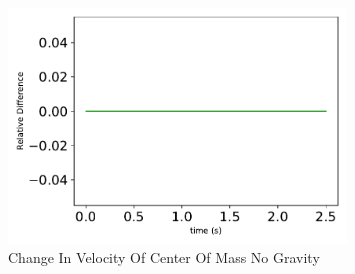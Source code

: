 \begin{figure}[htbp]\centerline{\includegraphics[width=0.8\textwidth]{AutoTeX/ChangeInVelocityOfCenterOfMassNoGravity}}\caption{Change In Velocity Of Center Of Mass No Gravity}\label{fig:ChangeInVelocityOfCenterOfMassNoGravity}\end{figure}